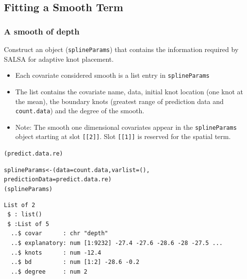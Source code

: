 \subsection{Fitting a Smooth Term}

\begin{frame}[fragile]
\frametitle{A smooth of depth}

Construct an object ({\tt splineParams}) that contains the information required by SALSA for adaptive knot placement.
\begin{itemize}
\item Each covariate considered smooth is a list entry in {\tt splineParams}
\item The list contains the covariate name, data, initial knot location (one knot at the mean), the boundary knots (greatest range of prediction data and {\tt count.data}) and the degree of the smooth.
\item Note:  The smooth one dimensional covariates appear in the {\tt splineParams} object starting at slot {\tt [[2]]}. Slot {\tt [[1]]} is reserved for the spatial term.
\end{itemize}

\begin{knitrout}\footnotesize
{}\color{fgcolor}\begin{kframe}
\begin{alltt}
(predict.data.re)

splineParams<-(data=count.data, varlist=(),
         predictionData=predict.data.re)
(splineParams)
\begin{verbatim}
List of 2
 $ : list()
 $ :List of 5
  ..$ covar      : chr "depth"
  ..$ explanatory: num [1:9232] -27.4 -27.6 -28.6 -28 -27.5 ...
  ..$ knots      : num -12.4
  ..$ bd         : num [1:2] -28.6 -0.2
  ..$ degree     : num 2
\end{verbatim}
\end{alltt}
\end{kframe}
\end{knitrout}

\begin{knitrout}\footnotesize
{}\color{fgcolor}
\end{knitrout}
\end{frame}

